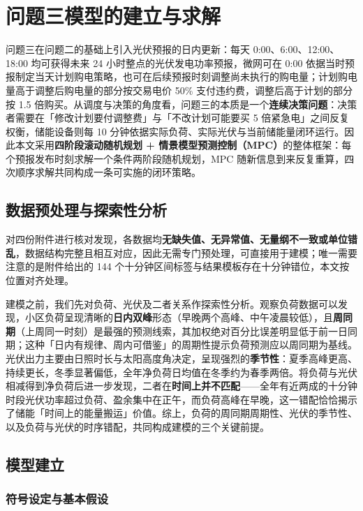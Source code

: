\section{问题三模型的建立与求解}

问题三在问题二的基础上引入光伏预报的日内更新：每天 0:00、6:00、12:00、18:00 均可获得未来 24 小时整点的光伏发电功率预报，微网可在 0:00 依据当时预报制定当天计划购电策略，也可在后续预报时刻调整尚未执行的购电量；计划购电量高于调整后购电量的部分按交易电价 50\% 支付违约费，调整后高于计划的部分按 1.5 倍购买。从调度与决策的角度看，问题三的本质是一个\textbf{连续决策问题}：决策者需要在「修改计划要付调整费」与「不改计划可能要买 5 倍紧急电」之间反复权衡，储能设备则每 10 分钟依据实际负荷、实际光伏与当前储能量闭环运行。因此本文采用\textbf{四阶段滚动随机规划 + 情景模型预测控制（MPC）}的整体框架：每个预报发布时刻求解一个条件两阶段随机规划，MPC 随新信息到来反复重算，四次顺序求解共同构成一条可实施的闭环策略。

\subsection{数据预处理与探索性分析}

对四份附件进行核对发现，各数据均\textbf{无缺失值、无异常值、无量纲不一致或单位错乱}，数据结构完整且相互对应，因此无需专门预处理，可直接用于建模；唯一需要注意的是附件给出的 144 个十分钟区间标签与结果模板存在十分钟错位，本文按位置对齐处理。

建模之前，我们先对负荷、光伏及二者关系作探索性分析。观察负荷数据可以发现，小区负荷呈现清晰的\textbf{日内双峰}形态（早晚两个高峰、中午凌晨较低），且\textbf{周同期}（上周同一时刻）是最强的预测线索，其加权绝对百分比误差明显低于前一日同期；这种「日内有规律、周内可借鉴」的周期性提示负荷预测应以周同期为基线。光伏出力主要由日照时长与太阳高度角决定，呈现强烈的\textbf{季节性}：夏季高峰更高、持续更长，冬季显著偏低，全年净负荷日均值在冬季约为春季两倍。将负荷与光伏相减得到净负荷后进一步发现，二者在\textbf{时间上并不匹配}——全年有近两成的十分钟时段光伏功率超过负荷、盈余集中在正午，而负荷高峰在早晚，这一错配恰恰揭示了储能「时间上的能量搬运」价值。综上，负荷的周同期周期性、光伏的季节性、以及负荷与光伏的时序错配，共同构成建模的三个关键前提。

\subsection{模型建立}

\subsubsection{符号设定与基本假设}

